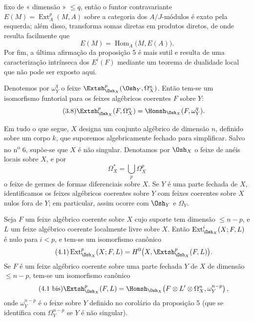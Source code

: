 fixo de « dimensão » $\leq q$, então o funtor contravariante
$E(M)=\operatorname{Ext}_{A}^{p}(M,A)$ sobre a categoria dos $A/J$-módulos é
exato pela esquerda; além disso, transforma somas diretas em produtos diretos,
de onde resulta facilmente que
\[
  E(M)=\operatorname{Hom}_{A}\bigl(M,E(A)\bigr).
\]
 Por fim, a
última afirmação da proposição 5 é mais sutil e resulta de uma
caracterização intrínseca dos $E^{i}(F)$ mediante um teorema de dualidade
local que não pode ser exposto aqui.

 Denotemos por $\omega_Y^{q}$ o feixe
$\Extsh_{\Osh_X}^{p}(\Osh_Y,\Omega_X^{n})$. Então tem-se um isomorfismo
funtorial para os feixes algébricos coerentes $F$ sobre $Y$:
\begin{equation}\tag{3.8}
  \Extsh_{\Osh_X}^{p}(F,\Omega_X^{n})
  =\Homsh_{\Osh_X}(F,\omega_Y^{q}).
\end{equation}


Em tudo o que segue, $X$ designa um conjunto algébrico de dimensão $n$, definido
sobre um corpo $k$, que suporemos algebricamente fechado para simplificar. Salvo
no n\textsuperscript{o} 6, supõe-se que $X$ é não singular. Denotamos por
$\Osh_X$ o feixe de anéis locais sobre $X$, e por
\[
  \Omega_X^{*}=\bigcup_p\Omega_X^{p}
\]
o feixe de germes de formas diferenciais sobre $X$.
Se $Y$ é uma parte fechada de $X$, identificamos
os feixes algébricos coerentes sobre $Y$ com feixes coerentes sobre $X$
nulos fora de $Y$; em particular, assim ocorre com $\Osh_Y$ e $\Omega_Y$.

 Seja $F$ um feixe algébrico coerente sobre $X$ cujo
suporte tem dimensão $\leq n-p$, e $L$ um feixe algébrico coerente
localmente livre sobre $X$. Então $\operatorname{Ext}_{\Osh_X}^{i}(X;F,L)$ é nulo
para $i<p$, e tem-se um isomorfismo canônico
\begin{equation}\tag{4.1}
  \operatorname{Ext}_{\Osh_X}^{p}(X;F,L)
  =H^{0}\bigl(X,\Extsh_{\Osh_X}^{p}(F,L)\bigr).
\end{equation}
Se $F$ é um feixe algébrico coerente sobre uma parte fechada $Y$ de $X$ de
dimensão $\leq n-p$, tem-se um isomorfismo canônico
\begin{equation}\tag{4.1 bis}
  \Extsh_{\Osh_X}^{p}(F,L)
  =\Homsh_{\Osh_X}\!\left(
    F\otimes L'\otimes\Omega_X^{n},\omega_Y^{n-p}
  \right),
\end{equation}
onde $\omega_Y^{n-p}$ é o feixe sobre $Y$ definido no corolário da
proposição 5 (que se identifica com $\Omega_Y^{n-p}$ se $Y$ é não singular).

